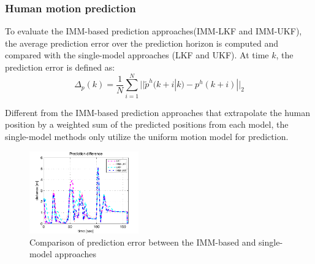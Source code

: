 \documentclass[letterpaper, 10 pt, conference]{ieeeconf}
\begin{document}
	\subsubsection{Human motion prediction}\label{subsubsec:motion_pred}
	To evaluate the IMM-based prediction approaches(IMM-LKF and IMM-UKF), the average prediction error over the prediction horizon is computed and compared with the single-model approaches (LKF and UKF). 
	At time $k$, the prediction error is defined as:
	\begin{equation}
		\Delta_p(k)=\frac{1}{N}\sum\limits_{i=1}^{N}||\tilde{p}^h(k+i|k)-p^h(k+i)||_2\label{eqn:pred_err}
	\end{equation}
	
	Different from the IMM-based prediction approaches that extrapolate the human position by a weighted sum of the predicted positions from each model, the single-model methods only utilize the uniform motion model for prediction.
	
	
	\begin{figure}
		\centering
		\includegraphics[width=0.42\textwidth]{figures/imm_vs_single}
		\caption{Comparison of prediction error between the IMM-based and single-model approaches}
		\label{fig:pred}
	\end{figure}
	
\end{document}
